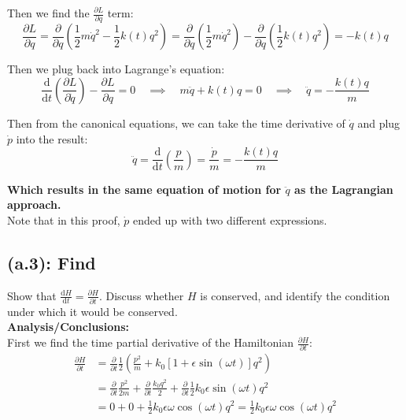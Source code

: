 \documentclass[titlepage]{article}
\begin{document}
Then we find the $\frac{\partial L}{\partial q}$ term:
\begin{equation}
	\frac{\partial L}{\partial q}=\frac{\partial}{\partial q}\left(\frac{1}{2}m\dot{q}^2-\frac{1}{2}k(t)q^2\right)=\frac{\partial}{\partial q}\left(\frac{1}{2}m\dot{q}^2\right)-\frac{\partial}{\partial q}\left(\frac{1}{2}k(t)q^2\right)=-k(t)q
\end{equation}

\begin{mdframed}[linewidth=1pt, innertopmargin=10pt, innerbottommargin=10pt]
	Then we plug back into Lagrange's equation:
	\begin{equation}
		\frac{\mathrm{d}}{\mathrm{d}t}\left(\frac{\partial L}{\partial\dot{q}}\right)-\frac{\partial L}{\partial q}=0\quad\implies\quad m\ddot{q}+k(t)q=0\quad\implies\quad\ddot{q}=-\frac{k(t)q}{m}
	\end{equation}
	
	Then from the canonical equations, we can take the time derivative of $\dot{q}$ and plug $\dot{p}$ into the result:
	\begin{equation}
		\ddot{q}=\frac{\mathrm{d}}{\mathrm{d}t}\left(\frac{p}{m}\right)=\frac{\dot{p}}{m}=-\frac{k(t)q}{m}
	\end{equation}
	
	\textbf{Which results in the same equation of motion for $\ddot{q}$ as the Lagrangian approach.}\\
	
	Note that in this proof, $\dot{p}$ ended up with two different expressions.
\end{mdframed}

\subsection*{(a.3): Find}

Show that $\frac{\mathrm{d}H}{\mathrm{d}t}=\frac{\partial H}{\partial t}$. Discuss whether $H$ is conserved, and identify the condition under which it would be conserved. \\

\textbf{Analysis/Conclusions:}\\

First we find the time partial derivative of the Hamiltonian $\frac{\partial H}{\partial t}$:
\begin{equation}
	\begin{split}
		\frac{\partial H}{\partial t}&=\frac{\partial}{\partial t}\frac{1}{2}\left(\frac{p^2}{m}+k_0\left[1+\epsilon\sin\left(\omega t\right)\right]q^2\right) \\
		&=\frac{\partial}{\partial t}\frac{p^2}{2m}+\frac{\partial}{\partial t}\frac{k_0 q^2}{2}+\frac{\partial}{\partial t}\frac{1}{2}k_0\epsilon\sin(\omega t)q^2 \\
		&=0+0+\frac{1}{2}k_0\epsilon\omega\cos(\omega t)q^2=\frac{1}{2}k_0\epsilon\omega\cos(\omega t)q^2
	\end{split}
	\label{eq:timepartial}
\end{equation}
\end{document}
